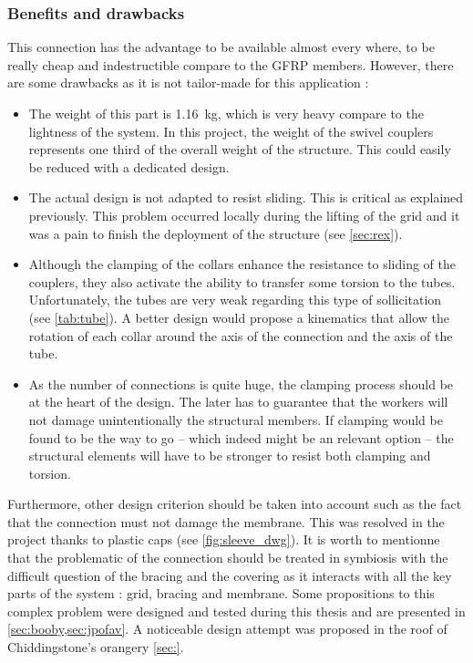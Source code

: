 \subsubsection{Benefits and drawbacks}
This connection has the advantage to be available almost every where, to be really cheap and indestructible compare to the GFRP members. However, there are some drawbacks as it is not tailor-made for this application :
\begin{itemize}
\item The weight of this part is \SI{1.16}{\kg}, which is very heavy compare to the lightness of the system. In this project, the weight of the swivel couplers represents one third of the overall weight of the structure. This could easily be reduced with a dedicated design.
\item The actual design is not adapted to resist sliding. This is critical as explained previously. This problem occurred locally during the lifting of the grid and it was a pain to finish the deployment of the structure (see \cref{sec:rex}).
\item  Although the clamping of the collars enhance the resistance to sliding of the couplers, they also activate the ability to transfer some torsion to the tubes. Unfortunately, the tubes are very weak regarding this type of sollicitation (see \cref{tab:tube}). A better design would propose a kinematics that allow the rotation of each collar around the axis of the connection and the axis of the tube.
\item  As the number of connections is quite huge, the clamping process should be at the heart of the design. The later has to guarantee that the workers will not damage unintentionally the structural members. If clamping would be found to be the way to go -- which indeed might be an relevant option -- the structural elements will have to be stronger to resist both clamping and torsion.
\end{itemize}

Furthermore, other design criterion should be taken into account such as the fact that the connection must not damage the membrane. This was resolved in the project thanks to plastic caps (see \cref{fig:sleeve_dwg}). It is worth to mentionne that the problematic of the connection should be treated in symbiosis with the difficult question of the bracing and the covering as it interacts with all the key parts of the system : grid, bracing and membrane. Some propositions to this complex problem were designed and tested during this thesis and are presented in \cref{sec:booby,sec:jpofav}. A noticeable design attempt was proposed in the roof of Chiddingstone's orangery \cref{sec:}.




